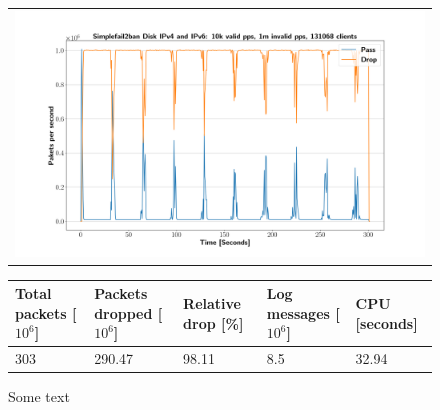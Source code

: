 \begin{figure}[p]
	\label{fig:simplefail2ban:disk:ip46:1m}
	\centering
	\scriptsize
	\begin{tabular}{c}
    	\centerline{\includegraphics[width=1.2\textwidth]{images/simplefail2ban_disk_ipv46_v10k_iv1m_c131068.png}}
	\end{tabular}
	\begin{tabular}{lllll}
		\toprule
		\textbf{Total packets [$10^6$]} & \textbf{Packets dropped [$10^6$]} & \textbf{Relative drop [\%]} & \textbf{Log messages [$10^6$]} & \textbf{CPU [seconds]} \\ \midrule 
		303 & 290.47 & 98.11 & 8.5 & 32.94 \\
	\bottomrule
	\end{tabular}
	\caption[Simplefail2ban Logfile IPv4 \& IPv6 1m PPS]{Some text}
\end{figure}

